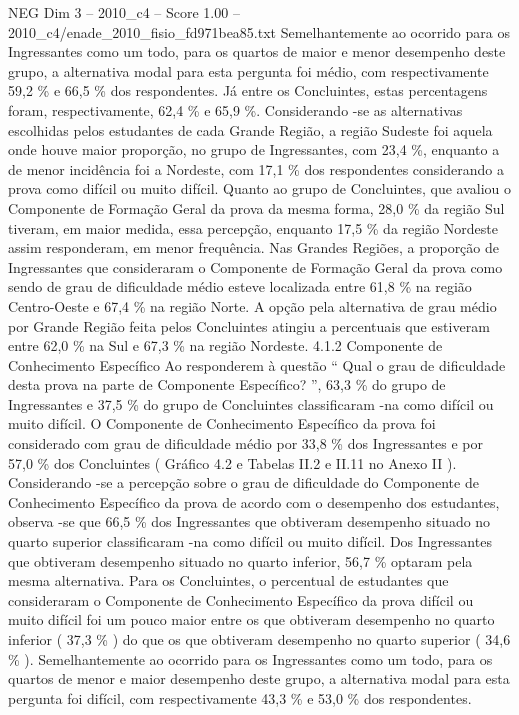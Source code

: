\begin{textsample}{NEG Dim 3 – 2010\_c4 – Score 1.00 – 2010\_c4/enade\_2010\_fisio\_fd971bea85.txt}
Semelhantemente ao ocorrido para os Ingressantes como um todo, para os quartos de maior e menor desempenho deste grupo, a alternativa modal para esta pergunta foi médio, com respectivamente 59,2 \% e 66,5 \% dos respondentes.
Já entre os Concluintes, estas percentagens foram, respectivamente, 62,4 \% e 65,9 \%.
Considerando -se as alternativas escolhidas pelos estudantes de cada Grande Região, a região Sudeste foi aquela onde houve maior proporção, no grupo de Ingressantes, com 23,4 \%, enquanto a de menor incidência foi a Nordeste, com 17,1 \% dos respondentes considerando a prova como difícil ou muito difícil.
Quanto ao grupo de Concluintes, que avaliou o Componente de Formação Geral da prova da mesma forma, 28,0 \% da região Sul tiveram, em maior medida, essa percepção, enquanto 17,5 \% da região Nordeste assim responderam, em menor frequência.
Nas Grandes Regiões, a proporção de Ingressantes que consideraram o Componente de Formação Geral da prova como sendo de grau de dificuldade médio esteve localizada entre 61,8 \% na região Centro-Oeste e 67,4 \% na região Norte.
A opção pela alternativa de grau médio por Grande Região feita pelos Concluintes atingiu a percentuais que estiveram entre 62,0 \% na Sul e 67,3 \% na região Nordeste. 4.1.2 Componente de Conhecimento Específico Ao responderem à questão “ Qual o grau de dificuldade desta prova na parte de Componente Específico? ”, 63,3 \% do grupo de Ingressantes e 37,5 \% do grupo de Concluintes classificaram -na como difícil ou muito difícil.
O Componente de Conhecimento Específico da prova foi considerado com grau de dificuldade médio por 33,8 \% dos Ingressantes e por 57,0 \% dos Concluintes ( Gráfico 4.2 e Tabelas II.2 e II.11 no Anexo II ).
Considerando -se a percepção sobre o grau de dificuldade do Componente de Conhecimento Específico da prova de acordo com o desempenho dos estudantes, observa -se que 66,5 \% dos Ingressantes que obtiveram desempenho situado no quarto superior classificaram -na como difícil ou muito difícil.
Dos Ingressantes que obtiveram desempenho situado no quarto inferior, 56,7 \% optaram pela mesma alternativa.
Para os Concluintes, o percentual de estudantes que consideraram o Componente de Conhecimento Específico da prova difícil ou muito difícil foi um pouco maior entre os que obtiveram desempenho no quarto inferior ( 37,3 \% ) do que os que obtiveram desempenho no quarto superior ( 34,6 \% ).
Semelhantemente ao ocorrido para os Ingressantes como um todo, para os quartos de menor e maior desempenho deste grupo, a alternativa modal para esta pergunta foi difícil, com respectivamente 43,3 \% e 53,0 \% dos respondentes.

\end{textsample}

